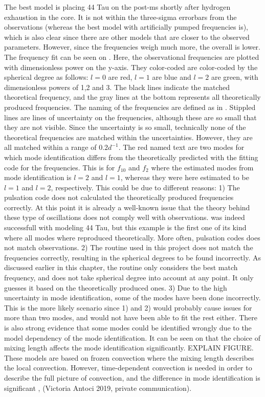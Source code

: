 The best model is placing 44 Tau on the post-ms shortly after hydrogen exhaustion in the core. It is not within the three-sigma errorbars from the observations (whereas the best model with artificially pumped frequencies is), which is also clear since there are other models that are closer to the observed parameters. However, since the frequencies weigh much more, the overall \chis is lower. The frequency fit can be seen on . Here, the observational frequencies are plotted with dimensionless power on the y-axis. They color-coded are color-coded by the spherical degree as follows: $l=0$ are red, $l=1$ are blue and  $l=2$ are green, with dimensionless powers of 1,2 and 3. The black lines indicate the matched theoretical frequency, and the gray lines at the bottom represents all theoretically produced frequencies. The naming of the frequencies are defined as in . Stippled lines are lines of uncertainty on the frequencies, although these are so small that they are not visible. Since the uncertainty is so small, technically none of the theoretical frequencies are matched within the uncertainties. However, they are all matched within a range of $0.2 d^{-1}$. The red named text are two modes for which mode identification differs from the theoretically predicted with the \chis fitting code for the frequencies. This is for $f_10$ and $f_2$ where the estimated modes from mode identification is $l=2$ and $l=1$, whereas they were here estimated to be $l=1$ and $l=2$, respectively. This could be due to different reasons: 1) The pulsation code does not calculated the theoretically produced frequencies correctly. At this point it is already a well-known issue that the theory behind these type of oscillations does not comply well with observations. \citet{lenz2010delta} was indeed successfull with modeling 44 Tau, but this example is the first one of its kind where all modes where reproduced theoretically. More often, pulsation codes does not match observations. 
2)  The \chis routine used in this project does not match the frequencies correctly, resulting in the spherical degrees to be found incorrectly. As discussed earlier in this chapter, the routine only considers the best match frequency, and does not take spherical degree into account at any point. It only guesses it based on the theoretically produced ones. 
3) Due to the high uncertainty in mode identification, some of the modes have been done incorrectly. This is the more likely scenario since 1) and 2) would probably cause issues for more than two modes, and would not have been able to fit the rest either. There is also strong evidence that some modes could be identified wrongly due to the model dependency of the mode identification. It can be seen on  that the choice of mixing length affects the mode identification significantly. EXPLAIN FIGURE. These models are based on frozen convection where the mixing length describes the local convection. However, time-dependent convection is needed in order to describe the full picture of convection, and the difference in mode identification is significant \citep{dupret2005time}, (Victoria Antoci 2019, private communication).


